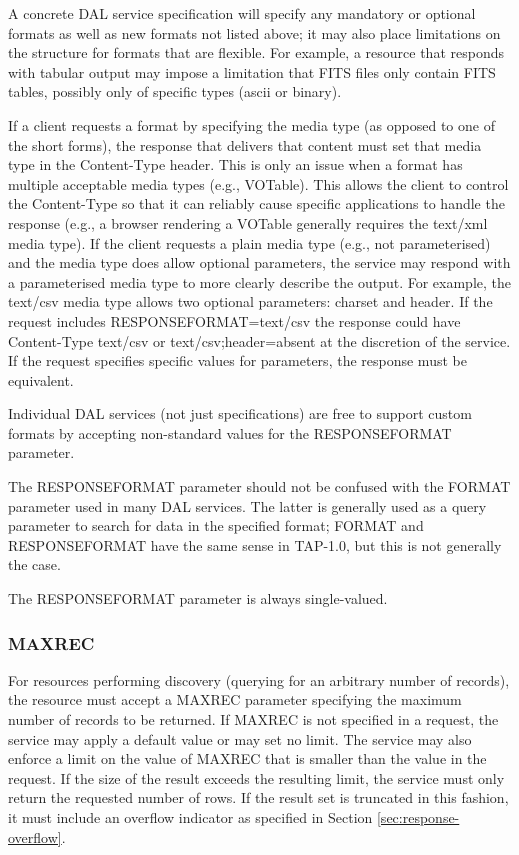 \documentclass[11pt,letter]{ivoa}
\begin{document}
A concrete DAL service specification will specify any mandatory or optional
formats as well as new formats not listed above; it may also place limitations
on the structure for formats that are flexible.  For example, a resource that
responds with tabular output may impose a limitation that FITS files only
contain FITS tables, possibly only of specific types (ascii or binary).

If a client requests a format by specifying the media type (as opposed to one of
the short forms), the response that delivers that content must set that
media type
in the Content-Type header. This is only an issue when a format has multiple
acceptable media types (e.g., VOTable). This allows the client to control the
Content-Type so that it can reliably cause specific applications to handle the
response (e.g., a browser rendering a VOTable generally requires the text/xml
media type). If the client requests a plain media type (e.g., not parameterised) and
the media type does allow optional parameters, the service may respond with a
parameterised media type to more clearly describe the output. For example, the
text/csv media type allows two optional parameters: charset and header. If the
request includes RESPONSEFORMAT=text/csv the response could have Content-Type
text/csv or text/csv;header=absent at the discretion of the service. If the
request specifies specific values for parameters, the response must be
equivalent.

Individual DAL services (not just specifications) are free to support custom
formats by accepting non-standard values for the RESPONSEFORMAT parameter.

The RESPONSEFORMAT parameter should not be confused with the FORMAT parameter
used in many DAL services. The latter is generally used as a query parameter to
search for data in the specified format; FORMAT and RESPONSEFORMAT have the same
sense in TAP-1.0, but this is not generally the case.

The RESPONSEFORMAT parameter is always single-valued.

\subsubsection{MAXREC}
\label{sec:MAXREC}
For resources performing discovery (querying for an arbitrary number of
records), the resource must accept a MAXREC parameter specifying the maximum
number of records to be returned. If MAXREC is not specified in a request, the
service may apply a default value or may set no limit. The service may also
enforce a limit on the value of MAXREC that is smaller than the value in the
request. If the size of the result exceeds the resulting limit, the service must
only return the requested number of rows. If the result set is truncated in this
fashion, it must include an overflow indicator as specified in Section \ref{sec:response-overflow}.
\end{document}
